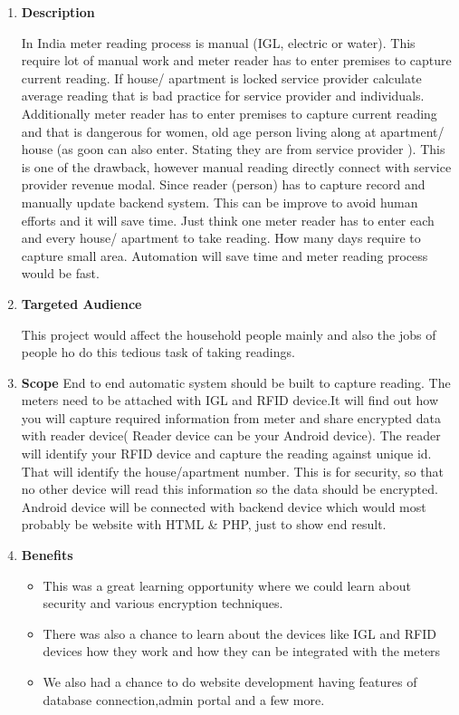 \documentclass[fleqn,10pt]{../SelfArx} %
\begin{document}
\vspace{0.5cm}
\begin{enumerate}
\item \textbf{Description}


In India meter reading process is manual (IGL, electric or water). This require lot of manual work and meter reader has to enter premises to capture current reading.
If house/ apartment is locked service provider calculate average reading that is bad practice for service provider and individuals.
Additionally meter reader has to enter premises to capture current reading and that is dangerous for women, old age person living along at apartment/ house (as goon can also enter. Stating they are from service provider ). This is one of the drawback, however manual reading directly connect with service provider revenue modal. Since reader (person) has to capture record and manually update backend system. This can be improve to avoid human efforts and it will save time.
Just think one meter reader has to enter each and every house/ apartment to take reading. How many days require to capture small area. Automation will save time and meter reading process would be fast.

\item \textbf{Targeted Audience}

This project would affect the household people mainly and also the jobs of people ho do this tedious task of taking readings.

\item \textbf{Scope}
End to end automatic system should be built to capture reading. The meters need to be attached with IGL and RFID device.It will find out how you will capture required information from meter and share encrypted data with reader device( Reader device can be your Android device). The reader will identify your RFID device and capture the reading against unique id. That will identify the house/apartment number. This is for security, so that no other device will read this information so the data should be encrypted. Android device will be connected with  backend device which would most probably be  website with HTML \& PHP, just to show end result.

\item \textbf{Benefits}
\begin{itemize}
    \item This was a great learning opportunity where we could learn about security and various encryption techniques.
    \item There was also a chance to learn about the devices like IGL and RFID devices how they work and how they can be integrated with the meters
    \item We also had a chance to do website development having features of database connection,admin portal and a few more.
\end{itemize}


\end{enumerate}
\end{document}

